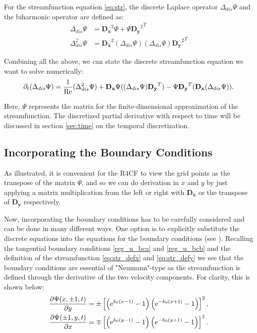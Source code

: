 For the streamfunction equation \eqref{eq:str}, the discrete Laplace operator
$\Delta_{dis} \Psi$ and the biharmonic operator are defined as:
\begin{align}
  \Delta_{dis} \Psi &= \mathbf{D_x}^2\Psi + \Psi{\mathbf{D_y}^2}^T \\
  \Delta_{dis}^2 \Psi &= \mathbf{D_x}^2(\Delta_{dis} \Psi) (\Delta_{dis}
    \Psi){\mathbf{D_y}^2}^T 
\end{align}

Combining all the above, we can state the discrete streamfunction equation we
want to solve numerically:
\vspace{-5pt}
\begin{align}
\partial_t (\Delta_{dis} \Psi) = \frac{1}{\mathrm{Re}} (\Delta_{dis}^2 \Psi)
  + \mathbf{D_x}\Psi((\Delta_{dis}\Psi)\mathbf{D_y}^T)
  - \Psi\mathbf{D_y}^T (\mathbf{D_x}(\Delta_{dis} \Psi)). 
\label{eq:str_dis}
\end{align}

Here, $\Psi$ represents the matrix for the finite-dimensional approximation of
the streamfunction. The discretized partial derivative with respect to time
will be discussed in section \ref{sec:time} on the temporal discretization.

\subsection{Incorporating the Boundary Conditions} \label{sec:bc}

As illustrated, it is convenient for the R4CF to view the grid points as the
transpose of the matrix $\Psi$, and so we can do derivation in $x$ and $y$ by
just applying a matrix multiplication from the left or right with
$\mathbf{D_x}$ or the transpose of $\mathbf{D_y}$ respectively. 

Now, incorporating the boundary conditions has to be carefully considered and
can be done in many different ways. One option is to explicitly substitute the
discrete equations into the equations for the boundary conditions (see
\cite{meseguer2020}). Recalling the tangential boundary conditions
\eqref{reg_u_bca} and \eqref{reg_u_bcb} and the definition of the
streamfunction \eqref{eq:str_defx} and \eqref{eq:str_defy} we see that the
boundary conditions are essential of "Neumann"-type as the streamfunction is
defined through the derivative of the two velocity components. For clarity,
this is shown below:
\begin{align}
\frac{\partial\Psi(x,\pm 1,t)}{\partial y} &= \pm\left[\left(\mathrm{e}^{k_0(x - 1)} - 1\right)
  \left(\mathrm{e}^{-k_0(x + 1)} - 1\right)\right]^2,\label{reg_psi_bca} \\
  \frac{\partial\Psi(\pm 1,y,t)}{\partial x} &= \mp\left[\left(\mathrm{e}^{k_0(y - 1)} - 1\right)
  \left(\mathrm{e}^{-k_0(y + 1)} - 1\right)\right]^2.\label{reg_psi_bcb}
\end{align}

